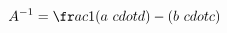 \documentclass[preview]{standalone}
\begin{document}
\begin{align*}
A^{-1}  = \fr a c {1}{( a  \ c d ot  d ) - ( b  \ c d ot  c )}
\end{align*}
\end{document}
